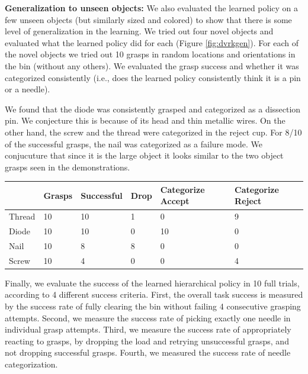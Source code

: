 


\vspace{0.25em} \noindent \textbf{Generalization to unseen objects: } We also evaluated the learned policy on a few unseen objects (but similarly sized and colored) to show that there is some level of generalization in the learning. We tried out four novel objects and evaluated what the learned policy did for each (Figure \ref{fig:dvrkgen}). For each of the novel objects we tried out 10 grasps in random locations and orientations in the bin (without any others). We evaluated the grasp success and whether it was categorized consistently (i.e., does the learned policy consistently think it is a pin or a needle).

We found that the diode was consistently grasped and categorized as a dissection pin. We conjecture this is because of its head and thin metallic wires. On the other hand, the screw and the thread were categorized in the reject cup. For 8/10 of the successful grasps, the nail was categorized as a failure mode. We conjucuture that since it is the large object it looks similar to the two object grasps seen in the demonstrations.

\begin{table}[ht!]\footnotesize
\centering
\label{my-label}
\begin{tabular}{l|l|l|l|l|l}
       & Grasps & Successful & Drop & Categorize Accept & Categorize Reject \\
       \hline
Thread & 10     & 10         & 1    & 0              & 9                 \\
Diode  & 10     & 10         & 0    & 10             & 0                 \\
Nail   & 10     & 8          & 8    & 0              & 0                 \\
Screw  & 10     & 4          & 0    & 0              & 4                
\end{tabular}
\end{table}


Finally, we evaluate the success of the learned hierarchical policy in 10 full trials, according to 4 different success criteria. First, the overall task success is measured by the success rate of fully clearing the bin without failing 4 consecutive grasping attempts. Second, we measure the success rate of picking exactly one needle in individual grasp attempts. Third, we measure the success rate of appropriately reacting to grasps, by dropping the load and retrying unsuccessful grasps, and not dropping successful grasps. Fourth, we measured the success rate of needle categorization.


